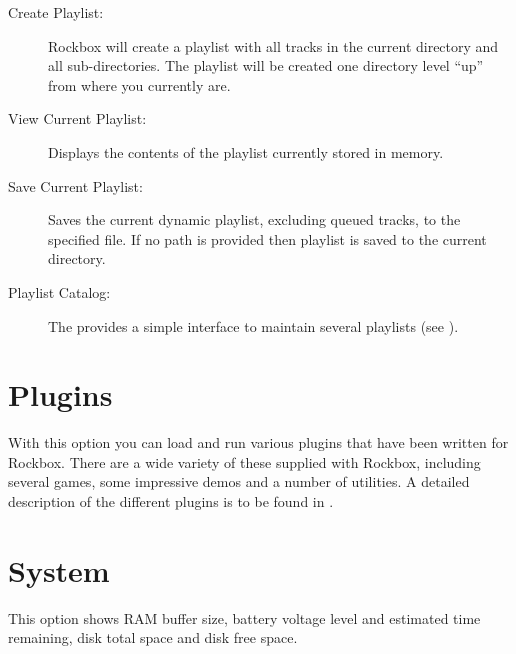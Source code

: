 \begin{description}
\item[Create Playlist:]
  Rockbox will create a playlist with all tracks in the current directory 
and all sub-directories. The playlist will be created one directory level ``up'' 
from where you currently are.
  
\item[View Current Playlist:]
  Displays the contents of the playlist currently stored in memory.
  
\item[Save Current Playlist:]
  Saves the current dynamic playlist, excluding queued tracks, to the 
specified file. If no path is provided then playlist is saved to the current 
directory.

\item[Playlist Catalog:]
  The  provides a simple interface to maintain
  several playlists (see ).
\end{description}

\section{Plugins}
  With this option you can load and run various plugins that have been
written for Rockbox. There are a wide variety of these supplied with
Rockbox, including several games, some impressive demos and a number of
utilities. A detailed description of the different plugins is to be found in 
.

\section{\label{ref:Info}System}
  This option shows RAM buffer size, battery voltage level and estimated time
remaining, disk total space and disk free space.

